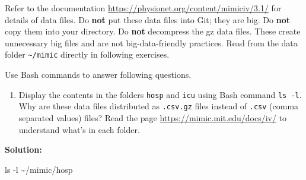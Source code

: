 \documentclass[
]{article}
\newenvironment{Shaded}{\begin{snugshade}}{\end{snugshade}}
\newcommand{\AttributeTok}[1]{\textcolor[rgb]{0.40,0.45,0.13}{#1}}
\newcommand{\FunctionTok}[1]{\textcolor[rgb]{0.28,0.35,0.67}{#1}}
\newcommand{\NormalTok}[1]{\textcolor[rgb]{0.00,0.23,0.31}{#1}}
\providecommand{\tightlist}{%
  \setlength{\itemsep}{0pt}\setlength{\parskip}{0pt}}\usepackage{longtable,booktabs,array}
\begin{document}
Refer to the documentation
\url{https://physionet.org/content/mimiciv/3.1/} for details of data
files. Do \textbf{not} put these data files into Git; they are big. Do
\textbf{not} copy them into your directory. Do \textbf{not} decompress
the gz data files. These create unnecessary big files and are not
big-data-friendly practices. Read from the data folder
\texttt{\textasciitilde{}/mimic} directly in following exercises.

Use Bash commands to answer following questions.

\begin{enumerate}
\def\labelenumi{\arabic{enumi}.}
\setcounter{enumi}{1}
\tightlist
\item
  Display the contents in the folders \texttt{hosp} and \texttt{icu}
  using Bash command \texttt{ls\ -l}. Why are these data files
  distributed as \texttt{.csv.gz} files instead of \texttt{.csv} (comma
  separated values) files? Read the page
  \url{https://mimic.mit.edu/docs/iv/} to understand what's in each
  folder.
\end{enumerate}

\textbf{Solution:}

\begin{Shaded}
\begin{Highlighting}[]
\FunctionTok{ls} \AttributeTok{{-}l}\NormalTok{ \textasciitilde{}/mimic/hosp}
\end{Highlighting}
\end{Shaded}
\end{document}
